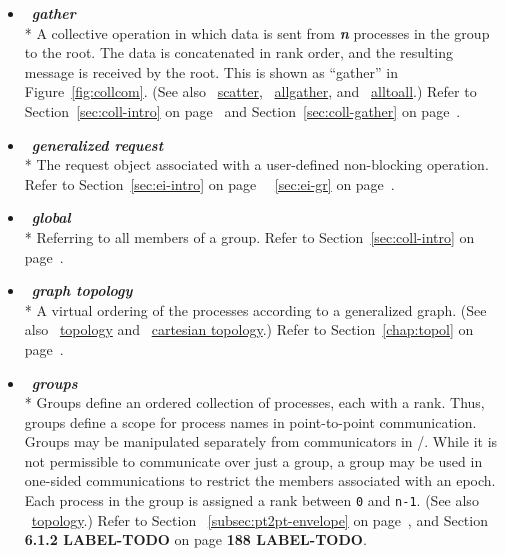 \begin{itemize}
\label{glossary:gather}
\item  ~\hypertarget{glossary:gather}{\emph{\textbf{gather}}} \\*
A collective operation in which data is sent from \emph{\textbf{n}} 
processes in the group to the root. The data is concatenated in rank order, and the
resulting message is received by the root.
This is shown as ``gather'' in Figure~\ref{fig:collcom}.
(See also ~\hyperlink{glossary:scatter}{scatter},
~\hyperlink{glossary:allgather}{allgather},
and ~\hyperlink{glossary:alltoall}{alltoall}.)
Refer to Section~\ref{sec:coll-intro} on page~\pageref{sec:coll-intro} and  
Section~\ref{sec:coll-gather} on page~\pageref{sec:coll-gather}.

\label{glossary:generalized_request}
\item  ~\hypertarget{glossary:generalized_request}{\emph{\textbf{generalized request}}} \\*
The request object associated with a user-defined non-blocking operation.
Refer to Section~\ref{sec:ei-intro} on page~\pageref{sec:ei-intro} 
~\ref{sec:ei-gr} on page~\pageref{sec:ei-gr}.

\label{glossary:global}
\item  ~\hypertarget{glossary:global}{\emph{\textbf{global}}} \\*
Referring to all members of a group.
Refer to Section~\ref{sec:coll-intro} on page~\pageref{sec:coll-intro}.

\label{glossary:graph_topology}
\item  ~\hypertarget{glossary:graph_topology}{\emph{\textbf{graph topology}}} \\*
A virtual ordering of the processes according to a generalized graph.
(See also ~\hyperlink{glossary:topology}{topology} and ~\hyperlink{glossary:cartesian_topology}{cartesian topology}.)
Refer to Section~\ref{chap:topol} on page~\pageref{chap:topol}.

\label{glossary:groups}
\item  ~\hypertarget{glossary:groups}{\emph{\textbf{groups}}} \\*
Groups define an ordered collection of processes, each with a rank. 
Thus, groups define a scope for process
names in point-to-point communication.  
Groups may be manipulated separately from
communicators in \MPI/. While it is not permissible to communicate over just a group,
a group may be used in one-sided communications to restrict the members associated with an epoch. 
Each process in
the group is assigned a rank between {\tt 0} and {\tt n-1}.
(See also ~\hyperlink{glossary:topology}{topology}.)
Refer to Section ~\ref{subsec:pt2pt-envelope} on page~\pageref{subsec:pt2pt-envelope},
and Section {\bf 6.1.2 LABEL-TODO} on page {\bf 188 LABEL-TODO}.


\end{itemize}
